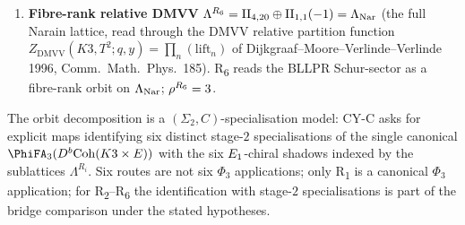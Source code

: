\begin{remark}
\begin{enumerate}[label=\textbf{R\arabic*.}]
 \item \textbf{Fibre-rank relative DMVV} $\Lambda^{R_6} = \mathrm{II}_{4, 20} \oplus \mathrm{II}_{1, 1}(-1) = \Lambda_{\mathrm{Nar}}$ (the full Narain lattice, read through the DMVV relative partition function $Z_{\mathrm{DMVV}}(K3, T^2; q, y) = \prod_n (\text{lift}_n)$ of Dijkgraaf--Moore--Verlinde--Verlinde 1996, Comm.~Math.~Phys.~185). R\textsubscript{6} reads the BLLPR Schur-sector as a fibre-rank orbit on $\Lambda_{\mathrm{Nar}}$; $\rho^{R_6} = 3$.
\end{enumerate}
The orbit decomposition is a $(\Sigma_2, C)$-specialisation model:
CY-C asks for explicit maps identifying six distinct stage-$2$
specialisations of the single canonical
$\PhiFA_3(D^b\Coh(K3 \times E))$ with the six
$E_{1}$-chiral shadows indexed by the sublattices $\Lambda^{R_i}$. Six
routes are not six $\Phi_3$ applications; only R\textsubscript{1} is
a canonical $\Phi_3$ application; for R\textsubscript{2}--R\textsubscript{6}
the identification with stage-$2$ specialisations is part of the bridge
comparison under the stated hypotheses.
\end{remark}

